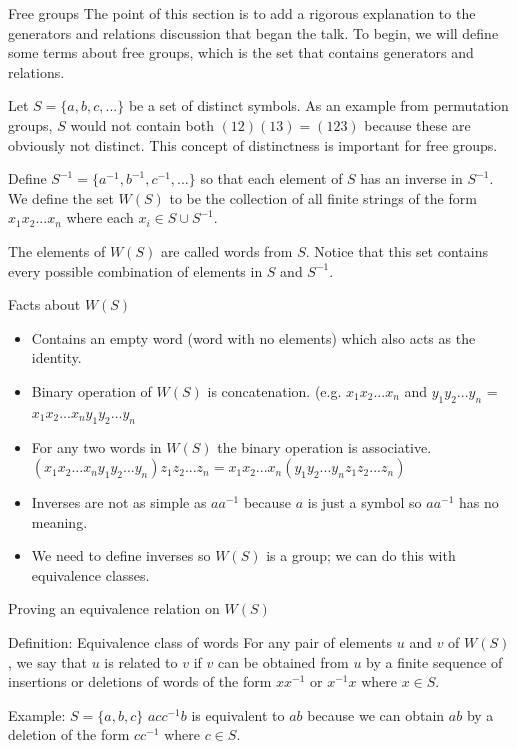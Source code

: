\documentclass{beamer}
\begin{document}
\begin{frame}{Free groups}
The point of this section is to add a rigorous explanation to the generators and relations discussion that began the talk. To begin, we will define some terms about free groups, which is the set that contains generators and relations.

Let $S = \{a, b, c, ...\}$ be a set of distinct symbols. As an example from permutation groups, $S$ would not contain both $(12)(13) = (123)$ because these are obviously not distinct. This concept of distinctness is important for free groups. \pause

Define $S^{-1} = \{a^{-1}, b^{-1}, c^{-1}, ...\}$ so that each element of $S$ has an inverse in $S^{-1}$. We define the set $W(S)$ to be the collection of all finite strings of the form $x_{1}x_{2}...x_{n}$ where each $x_{i} \in S \cup S^{-1}$. \pause

The elements of $W(S)$ are called words from $S$. Notice that this set contains every possible combination of elements in $S$ and $S^{-1}$.
\end{frame}

\begin{frame}{Facts about $W(S)$}
\begin{itemize}
    \item<1-> Contains an empty word (word with no elements) which also acts as the identity.
    \item<2-> Binary operation of $W(S)$ is concatenation. (e.g. $x_{1}x_{2}...x_{n}$ and $y_{1}y_{2}...y_{n}$ = $x_{1}x_{2}...x_{n}y_{1}y_{2}...y_{n}$
    \item<3-> For any two words in $W(S)$ the binary operation is associative. 
    $(x_{1}x_{2}...x_{n}y_{1}y_{2}...y_{n}) z_{1}z_{2}...z_{n} = x_{1}x_{2}...x_{n}(y_{1}y_{2}...y_{n} z_{1}z_{2}...z_{n})$
    \item<4-> Inverses are not as simple as $aa^{-1}$ because $a$ is just a symbol so $aa^{-1}$ has no meaning.
    \item<5-> We need to define inverses so $W(S)$ is a group; we can do this with equivalence classes.
\end{itemize}
\end{frame}

\begin{frame}{Proving an equivalence relation on $W(S)$}
\begin{block}{Definition: Equivalence class of words}
For any pair of elements $u$ and $v$ of $W(S)$, we say that $u$ is related to $v$ if $v$ can be obtained from $u$ by a finite sequence of insertions or deletions of words of the form $xx^{-1}$ or $x^{-1}x$ where $x \in S$.
\end{block}

\begin{block}{Example: $S = {\{a, b, c\}}$}
$acc^{-1}b$ is equivalent to $ab$ because we can obtain $ab$ by a deletion of the form $cc^{-1}$ where $c \in S$.
\end{block}
\end{frame}
\end{document}
